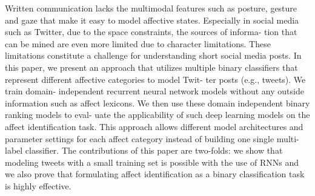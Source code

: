Written communication lacks the multimodal features such as posture, gesture and gaze that make it easy to model affective states. Especially in social media such as Twitter, due to the space constraints, the sources of informa- tion that can be mined are even more limited due to character limitations. These limitations constitute a challenge for understanding short social media posts. In this paper, we present an approach that utilizes multiple binary classifiers that represent different affective categories to model Twit- ter posts (e.g., tweets). We train domain- independent recurrent neural network models without any outside information such as affect lexicons. We then use these domain independent binary ranking models to eval- uate the applicability of such deep learning models on the affect identification task. This approach allows different model architectures and parameter settings for each affect category instead of building one single multi-label classifier. The contributions of this paper are two-folds: we show that modeling tweets with a small training set is possible with the use of RNNs and we also prove that formulating affect identification as a binary classification task is highly effective.

